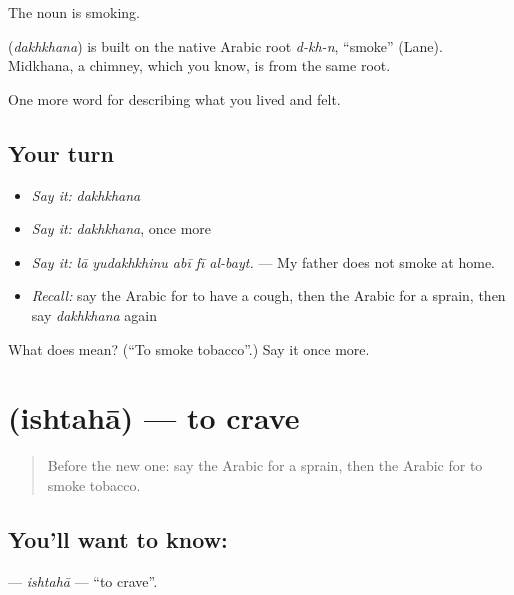 The noun  is smoking.

\begin{cousinweb}
\textbf{} (\emph{dakhkhana}) is built on the native Arabic root \emph{d-kh-n}, \textquotedblleft{}smoke\textquotedblright{} (Lane). Midkhana, a chimney, which you know, is from the same root.
\end{cousinweb}

\begin{grammarlens}[title={What you've built}]
One more word for describing what you lived and felt.
\end{grammarlens}

\subsection*{Your turn}
\begin{itemize}
\raggedright
  \item \emph{Say it:} \emph{dakhkhana}
  \item \emph{Say it:} \emph{dakhkhana}, once more
  \item \emph{Say it:} \emph{lā yudakhkhinu abī fī al-bayt.} — My father does not smoke at home.
  \item \emph{Recall:} say the Arabic for to have a cough, then the Arabic for a sprain, then say \emph{dakhkhana} again
\end{itemize}

\begin{tcolorbox}[breakable,colback=teal!4,colframe=teal!35!black,title={Before you move on}]
What does  mean? (\textquotedblleft{}To smoke tobacco\textquotedblright{}.) Say it once more.
\end{tcolorbox}
\section[\texorpdfstring{\ar{اشتهى} (ishtahā)}{اشتهى (ishtahā)}]{ (ishtahā) — to crave}

\label{lesson:AR-C517-ishtaha}



\begin{quote}
Before the new one: say the Arabic for a sprain, then the Arabic for to smoke tobacco.
\end{quote}

\subsection*{You'll want to know: }
\textbf{} — \emph{ishtahā} — \textquotedblleft{}to crave\textquotedblright{}.

